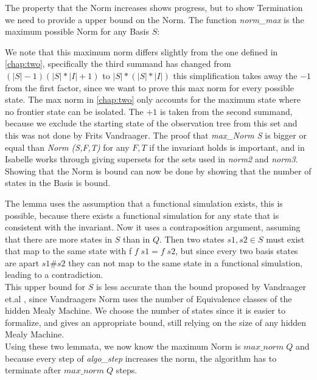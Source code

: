 The property that the Norm increases shows progress, but to show Termination we need to provide a upper bound on the Norm. The function \textit{norm\_max} is the maximum possible Norm for any Basis $S$: 
\begin{myisabelle}
	\maxnorm
\end{myisabelle}
We note that this maximum norm differs slightly from the one defined in \autoref{chap:two}, specifically the third summand has changed from $(|S|-1)(|S|*|I|+1)$ to $|S|*(|S|*|I|)$ this simplification takes away the $-1$  from the first factor, since we want to prove this max norm for every possible state. The max norm in \autoref{chap:two} only accounts for the maximum state where no frontier state can be isolated. The $+1$ is taken from the second summand, because we exclude the starting state of the observation tree from this set and this was not done by Frits Vandraager. 
The proof that \textit{max\_Norm S} is bigger or equal than \textit{Norm (S,F,T)} for any $F,T$ if the invariant holds is important, and in Isabelle works through giving supersets for the sets used in \textit{norm2} and \textit{norm3}. Showing that the Norm is bound can now be done by showing that the number of states in the Basis is bound. 
\begin{myisabelle}
\maxs
\end{myisabelle}
The lemma uses the assumption that a functional simulation exists, this is possible, because there exists a functional simulation for any state that is consistent with the invariant. Now it uses a contraposition argument, assuming that there are more states in $S$ than in $Q$. Then two states $s1,s2\in S$ must exist that map to the same state with f $f\; s1=f\; s2$, but since every two basis states are apart $s1\#s2$ they can not map to the same state in a functional simulation, leading to a contradiction.\\
This upper bound for $S$ is less accurate than the bound proposed by Vandraager et.al \cite{vandraagerlsharp}, since Vandraagers Norm uses the number of Equivalence classes of the hidden Mealy Machine. We choose the number of states since it is easier to formalize, and gives an appropriate bound, still relying on the size of any hidden Mealy Machine. \\
Using these two lemmata, we now know the maximum Norm is $max\_norm\; Q$ and because every step of \textit{algo\_step} increases the norm, the algorithm has to terminate after $max\_norm\; Q$ steps. 

